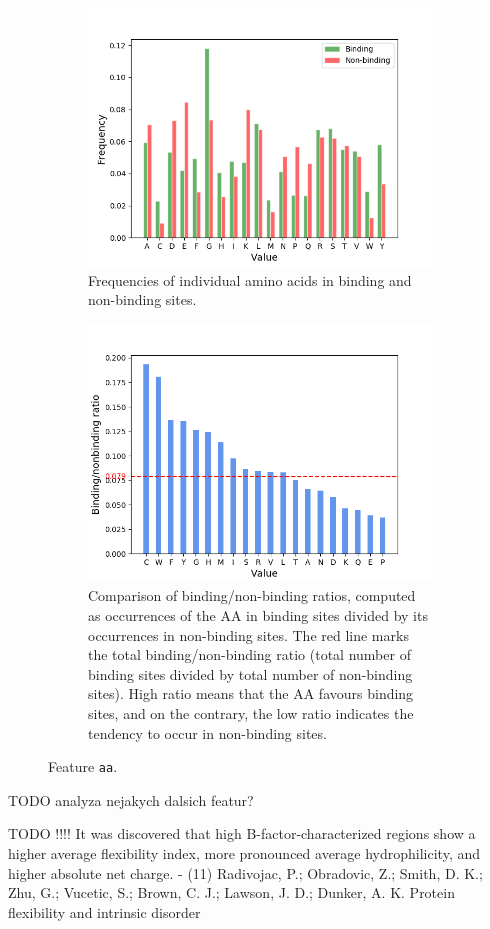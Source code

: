 \begin{figure}[!htbp]
\centering
\begin{subfigure}{\textwidth}
  \centering
  \includegraphics[width=0.7\linewidth]{../img/aa_frequencies.png}
  \caption{Frequencies of individual amino acids in binding and non-binding sites.}
\end{subfigure}
\begin{subfigure}{\textwidth}
  \centering
  \includegraphics[width=0.7\linewidth]{../img/aa_ratios.png}
  \caption{Comparison of binding/non-binding ratios, computed as occurrences of the AA in binding sites divided by its occurrences in non-binding sites. The red line marks the total binding/non-binding ratio (total number of binding sites divided by total number of non-binding sites). High ratio means that the AA favours binding sites, and on the contrary, the low ratio indicates the tendency to occur in non-binding sites.}
\end{subfigure}
\caption{Feature \texttt{aa}.}
\label{fig:aa}
\end{figure}

TODO analyza nejakych dalsich featur?

TODO !!!!  It was discovered that high B-factor-characterized regions show a
higher average flexibility index, more pronounced average
hydrophilicity, and higher absolute net charge. - (11) Radivojac, P.; Obradovic, Z.; Smith, D. K.; Zhu, G.; Vucetic, S.;
Brown, C. J.; Lawson, J. D.; Dunker, A. K. Protein flexibility and
intrinsic disorder

